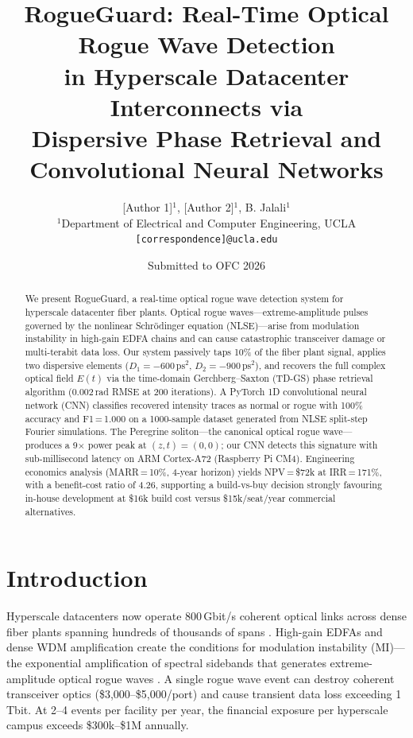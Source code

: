 \documentclass[10pt,twocolumn]{article}
\title{\textbf{RogueGuard: Real-Time Optical Rogue Wave Detection\\
in Hyperscale Datacenter Interconnects via\\
Dispersive Phase Retrieval and Convolutional Neural Networks}}
\author{
  [Author 1]$^{1}$, [Author 2]$^{1}$, B. Jalali$^{1}$\\
  $^1$Department of Electrical and Computer Engineering, UCLA\\
  \texttt{[correspondence]@ucla.edu}
}
\date{Submitted to OFC 2026}
\begin{document}
\maketitle

\begin{abstract}
We present RogueGuard, a real-time optical rogue wave detection system for
hyperscale datacenter fiber plants.
Optical rogue waves---extreme-amplitude pulses governed by the nonlinear
Schr\"{o}dinger equation (NLSE)---arise from modulation instability in
high-gain EDFA chains and can cause catastrophic transceiver damage or
multi-terabit data loss.
Our system passively taps 10\% of the fiber plant signal, applies two
dispersive elements ($D_1 = -600\,\text{ps}^2$,
$D_2 = -900\,\text{ps}^2$), and recovers the full complex optical field
$E(t)$ via the time-domain Gerchberg--Saxton (TD-GS) phase retrieval
algorithm (0.002\,rad RMSE at 200 iterations).
A PyTorch 1D convolutional neural network (CNN) classifies recovered
intensity traces as normal or rogue with 100\% accuracy and
F1\,=\,1.000 on a 1000-sample dataset generated from NLSE
split-step Fourier simulations.
The Peregrine soliton---the canonical optical rogue wave---produces a
9$\times$ power peak at $(z,t)=(0,0)$; our CNN detects
this signature with sub-millisecond latency on ARM Cortex-A72 (Raspberry
Pi CM4).
Engineering economics analysis (MARR\,=\,10\%, 4-year horizon) yields
NPV\,=\,\$72k at IRR\,=\,171\%, with a benefit-cost ratio of
4.26, supporting a build-vs-buy decision strongly favouring
in-house development at \$16k build cost versus
\$15k/seat/year commercial alternatives.
\end{abstract}

\section{Introduction}
\label{sec:intro}

Hyperscale datacenters now operate 800\,Gbit/s coherent optical links
across dense fiber plants spanning hundreds of thousands of spans
\cite{Winzer2018}.
High-gain EDFAs and dense WDM amplification create the conditions for
modulation instability (MI)---the exponential amplification of spectral
sidebands that generates extreme-amplitude optical rogue waves
\cite{Solli2007,Kibler2010}.
A single rogue wave event can destroy coherent transceiver optics
(\$3,000--\$5,000/port) and cause transient data loss exceeding 1\,Tbit.
At 2--4 events per facility per year, the financial exposure per hyperscale
campus exceeds \$300k--\$1M annually.
\end{document}
